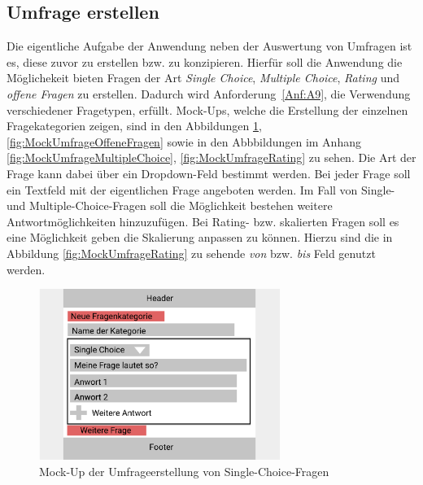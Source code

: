 \subsection{Umfrage erstellen}
\label{ssec:konzept:client:umfrage_erstellen}

Die eigentliche Aufgabe der Anwendung neben der Auswertung von Umfragen ist es, diese zuvor zu erstellen bzw. zu konzipieren.
Hierfür soll die Anwendung die Möglichekeit bieten Fragen der Art \emph{Single Choice}, \emph{Multiple Choice}, \emph{Rating} und \emph{offene Fragen} zu erstellen.
Dadurch wird Anforderung~\ref{Anf:A9}, die Verwendung verschiedener Fragetypen, erfüllt.
Mock-Ups, welche die Erstellung der einzelnen Fragekategorien zeigen, sind in den Abbildungen \ref{fig:MockUmfrageSingleChoice}, \ref{fig:MockUmfrageOffeneFragen} sowie in den Abbbildungen im Anhang \ref{fig:MockUmfrageMultipleChoice}, \ref{fig:MockUmfrageRating} zu sehen.
Die Art der Frage kann dabei über ein Dropdown-Feld bestimmt werden.
Bei jeder Frage soll ein Textfeld mit der eigentlichen Frage angeboten werden.
Im Fall von Single- und Multiple-Choice-Fragen soll die Möglichkeit bestehen weitere Antwortmöglichkeiten hinzuzufügen.
Bei Rating- bzw. skalierten Fragen soll es eine Möglichkeit geben die Skalierung anpassen zu können.
Hierzu sind die in Abbildung \ref{fig:MockUmfrageRating} zu sehende \emph{von} bzw. \emph{bis} Feld genutzt werden.

\begin{figure}[H]
	\centering
	\includegraphics[width=0.7\textwidth]{img/konzeption/client/umfrage_erstellen_single_choice}
	\captionsetup{justification=centering, format=plain}
	\caption[Mock-Up der Umfrageerstellung von Single-Choice-Fragen]{Mock-Up der Umfrageerstellung von Single-Choice-Fragen\\\figma}
	\label{fig:MockUmfrageSingleChoice}
\end{figure}

